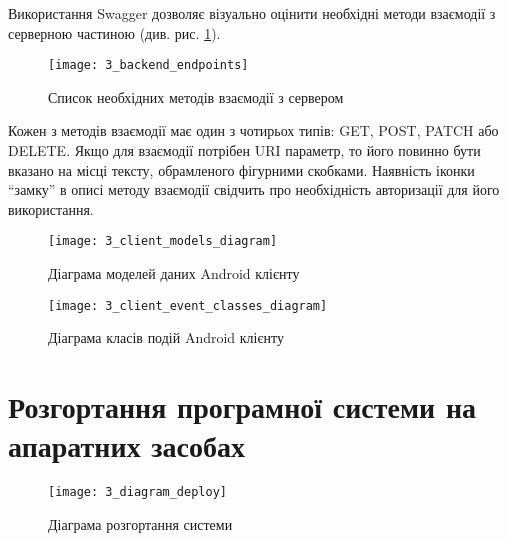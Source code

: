 \documentclass[../main.tex]{subfiles}
\begin{document}
Використання Swagger дозволяє візуально оцінити необхідні методи взаємодії з серверною частиною (див. рис. \ref{available_rest_endpoints}).

\begin{figure}[H]
	\centering
	\texttt{[image: 3\_backend\_endpoints]}
	\caption{Список необхідних методів взаємодії з сервером}
	\label{available_rest_endpoints}
\end{figure}

Кожен з методів взаємодії має один з чотирьох типів: GET, POST, PATCH або DELETE. Якщо для взаємодії потрібен URI параметр, то його повинно бути вказано на місці тексту, обрамленого фігурними скобками. Наявність іконки \enquote{замку} в описі методу взаємодії свідчить про необхідність авторизації для його використання.

\begin{figure}[H]
	\centering
	\texttt{[image: 3\_client\_models\_diagram]}
	\caption{Діаграма моделей даних Android клієнту}
\end{figure}

\begin{figure}[H]
	\centering
	\texttt{[image: 3\_client\_event\_classes\_diagram]}
	\caption{Діаграма класів подій Android клієнту}
\end{figure}

\section{Розгортання програмної системи на апаратних засобах}

\begin{figure}[H]
	\centering
	\texttt{[image: 3\_diagram\_deploy]}
	\caption{Діаграма розгортання системи}
\end{figure}
\end{document}
